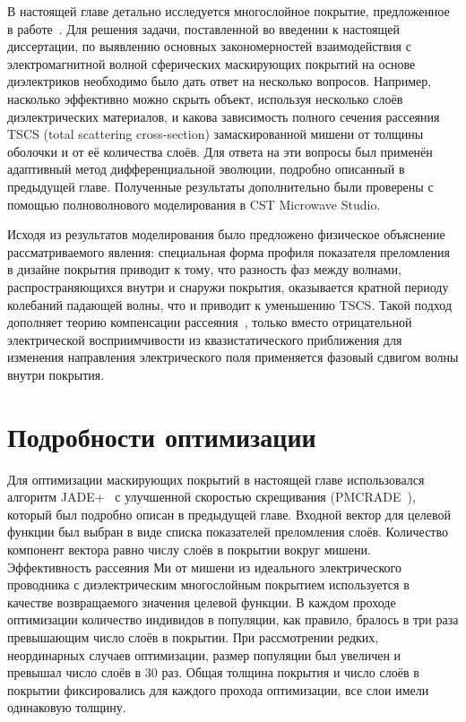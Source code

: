 В настоящей главе детально исследуется многослойное покрытие,
предложенное в работе~\cite{Semouchkina-2013}. Для решения задачи,
поставленной во введении к настоящей диссертации, по выявлению
основных закономерностей взаимодействия с электромагнитной волной
сферических маскирующих покрытий на основе диэлектриков необходимо
было дать ответ на несколько вопросов. Например, насколько эффективно
можно скрыть объект, используя несколько слоёв диэлектрических
материалов, и какова зависимость полного сечения рассеяния TSCS (total
scattering cross-section) замаскированной мишени от толщины оболочки и
от её количества слоёв. Для ответа на эти вопросы был применён
адаптивный метод дифференциальной эволюции, подробно описанный в
предыдущей главе. Полученные результаты дополнительно были проверены с
помощью полноволнового моделирования в CST Microwave
Studio.\cite{CST-web}
 
Исходя из результатов моделирования было предложено физическое
объяснение рассматриваемого явления: специальная форма профиля
показателя преломления в дизайне покрытия приводит к тому, что
разность фаз между волнами, распространяющихся внутри и снаружи
покрытия, оказывается кратной периоду колебаний падающей волны, что и
приводит к уменьшению TSCS. Такой подход дополняет теорию компенсации
рассеяния~\cite{alu}, только вместо отрицательной электрической
восприимчивости из квазистатического приближения для изменения
направления электрического поля применяется фазовый сдвигом волны
внутри покрытия.

\section{Подробности оптимизации}
Для оптимизации маскирующих покрытий в настоящей главе использовался
алгоритм JADE+~\cite{Jingqiao-JADE-2009} с улучшенной скоростью
скрещивания (PMCRADE~\cite{Jie-PMCRADE-2011}), который был подробно
описан в предыдущей главе.  Входной вектор для целевой функции был
выбран в виде списка показателей преломления слоёв. Количество
компонент вектора равно числу слоёв в покрытии вокруг
мишени. Эффективность рассеяния Ми от мишени из идеального
электрического проводника с диэлектрическим многослойным покрытием
используется в качестве возвращаемого значения целевой функции. В
каждом проходе оптимизации количество индивидов в популяции, как
правило, бралось в три раза превышающим число слоёв в покрытии. При
рассмотрении редких, неординарных случаев оптимизации, размер
популяции был увеличен и превышал число слоёв в 30 раз. Общая толщина
покрытия и число слоёв в покрытии фиксировались для каждого прохода
оптимизации, все слои имели одинаковую толщину.
 

